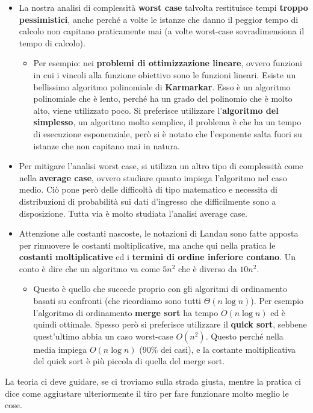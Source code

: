 \documentclass{article}
\begin{document}
\begin{itemize}
    \item La nostra analisi di complessità \textbf{worst case} talvolta restituisce tempi \textbf{troppo
          pessimistici}, anche perché a volte le istanze che danno il peggior tempo di calcolo non capitano
          praticamente mai (a volte worst-case sovradimensiona il tempo di calcolo).
          \begin{itemize}
              \item Per esempio: nei \textbf{problemi di ottimizzazione lineare}, ovvero funzioni in cui i vincoli
                    alla funzione obiettivo sono le funzioni lineari. Esiste un bellissimo algoritmo polinomiale
                    di \textbf{Karmarkar}. Esso è un algoritmo polinomiale che è lento, perché ha un grado del polinomio
                    che è molto alto, viene utilizzato poco. Si preferisce utilizzare l'\textbf{algoritmo del simplesso},
                    un algoritmo molto semplice, il problema è che ha un tempo di esecuzione esponenziale, però
                    si è notato che l'esponente salta fuori su istanze che non capitano mai in natura.
          \end{itemize}

    \item Per mitigare l'analisi worst case, si utilizza un altro tipo di complessità come nella
          \textbf{average case}, ovvero studiare quanto impiega l'algoritmo nel caso medio. Ciò pone
          però delle difficoltà di tipo matematico e necessita di distribuzioni di probabilità sui dati
          d'ingresso che difficilmente sono a disposizione. Tutta via è molto studiata l'analisi
          average case.

    \item Attenzione alle costanti nascoste, le notazioni di Landau sono fatte apposta per
          rimuovere le costanti moltiplicative, ma anche qui nella pratica le \textbf{costanti moltiplicative}
          ed i \textbf{termini di ordine inferiore contano}. Un conto è dire che un algoritmo va come $5n^2$
          che è diverso da $10n^2$.
          \begin{itemize}
              \item Questo è quello che succede proprio con gli algoritmi di ordinamento
                    basati su confronti (che ricordiamo sono tutti $\Theta (n\log n)$). Per
                    esempio l'algoritmo di ordinamento \textbf{merge sort} ha tempo $O(n\log n)$ ed
                    è quindi ottimale. Spesso però si preferisce utilizzare il \textbf{quick sort}, sebbene
                    quest'ultimo abbia un caso worst-case $O(n^2)$. Questo perché nella media
                    impiega $O(n\log n)$ ($90\%$ dei casi), e la costante moltiplicativa del quick sort
                    è più piccola di quella del merge sort.
          \end{itemize}

\end{itemize}
La teoria ci deve guidare, se ci troviamo sulla strada giusta, mentre la pratica ci dice
come aggiustare ulteriormente il tiro per fare funzionare molto meglio le cose.
\end{document}

